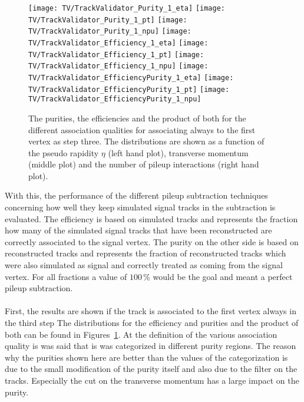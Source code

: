 \begin{figure}[h!t]
  \centering
  \texttt{[image: TV/TrackValidator\_Purity\_1\_eta]}
  \texttt{[image: TV/TrackValidator\_Purity\_1\_pt]}
  \texttt{[image: TV/TrackValidator\_Purity\_1\_npu]}
  \newline
  \texttt{[image: TV/TrackValidator\_Efficiency\_1\_eta]}
  \texttt{[image: TV/TrackValidator\_Efficiency\_1\_pt]}
  \texttt{[image: TV/TrackValidator\_Efficiency\_1\_npu]}
  \newline
  \texttt{[image: TV/TrackValidator\_EfficiencyPurity\_1\_eta]}
  \texttt{[image: TV/TrackValidator\_EfficiencyPurity\_1\_pt]}
  \texttt{[image: TV/TrackValidator\_EfficiencyPurity\_1\_npu]}
  \caption[Purities, efficiencies and their product for the different quality of the association map with associating to the first vertex always as third step]{The purities, the efficiencies and the product of both for the different association qualities for associating always to the first vertex as step three. The distributions are shown as a function of the pseudo rapidity $\eta$ (left hand plot), transverse momentum (middle plot) and the number of pileup interactions (right hand plot). \label{plot:TASEFRDQ1Signal}}
\end{figure}

\clearpage{}

With this, the performance of the different pileup subtraction techniques concerning how well they keep simulated signal tracks in the subtraction is evaluated. The efficiency is based on simulated tracks and represents the fraction how many of the simulated signal tracks that have been reconstructed are correctly associated to the signal vertex. The purity on the other side is based on reconstructed tracks and represents the fraction of reconstructed tracks which were also simulated as signal and correctly treated as coming from the signal vertex. For all fractions a value of $100\,\%$ would be the goal and meant a perfect pileup subtraction. \\ \\
First, the results are shown if the track is associated to the first vertex always in the third step The distributions for the efficiency and purities and the product of both can be found in Figures~\ref{plot:TASEFRDQ1Signal}. At the definition of the various association quality is was said that is was categorized in different purity regions. The reason why the purities shown here are better than the values of the categorization is due to the small modification of the purity itself and also due to the filter on the tracks. Especially the cut on the transverse momentum has a large impact on the purity.


